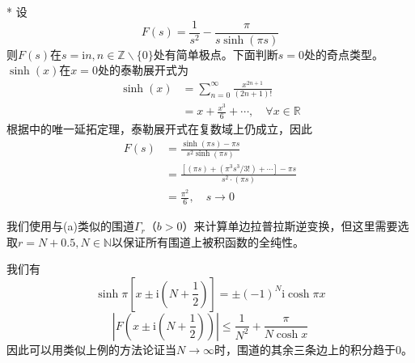 \begin{example}*
    设\[F(s)=\frac{1}{s^2}-\frac{\pi}{s\sinh(\pi s)}\]
    则$F(s)$在$s=\mathrm{i}n,n\in\mathbb{Z}\backslash\{0\}$处有简单极点。下面判断$s=0$处的奇点类型。$\sinh(x)$在$x=0$处的泰勒展开式为
    \begin{align*}
        \sinh(x)&=\sum_{n=0}^{\infty}\frac{x^{2n+1}}{(2n+1)!}\\
        &=x+\frac{x^3}{6}+\cdots,\quad \forall x\in\mathbb{R}
    \end{align*}
    根据中的唯一延拓定理，泰勒展开式在复数域上仍成立，因此
    \begin{align*}
        F(s)&=\frac{\sinh(\pi s)-\pi s}{s^2 \sinh(\pi s)}\\
        &=\frac{[(\pi s)+(\pi^3s^3/3!)+\cdots]-\pi s}{s^2 \cdot(\pi s)}\\
        &=\frac{\pi^2}{6},\quad s\to 0
    \end{align*}

    我们使用与(a)类似的围道$\Gamma_r$（$b>0$）来计算单边拉普拉斯逆变换，但这里需要选取$r=N+0.5,N\in\mathbb{N} $以保证所有围道上被积函数的全纯性。

    我们有
    \[\sinh\pi\left[x\pm \mathrm{i}\left(N+\frac{1}{2}\right)\right]=\pm(-1)^N \mathrm{i}\cosh\pi x\]
    \[\left|F\left(x\pm \mathrm{i}\left(N+\frac{1}{2}\right)\right)\right|\leq \frac{1}{N^2}+\frac{\pi}{N\cosh x}\]
    因此可以用类似上例的方法论证当$N\to\infty$时，围道的其余三条边上的积分趋于0。


\end{example}
